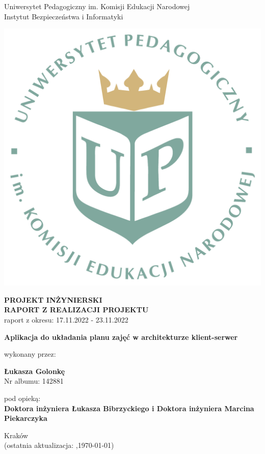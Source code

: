 \documentclass[12pt,a4paper,oneside]{article}
\theoremstyle{definition}
\numberwithin{equation}{section}
\begin{document}

\thispagestyle{empty}
\begin{titlepage}
\begin{center}\Large
Uniwersytet Pedagogiczny im. Komisji Edukacji Narodowej \\
\large
Instytut Bezpieczeństwa i Informatyki\\
\vskip 10pt
\end{center}
\begin{center}
\centering \includegraphics[width=0.4\columnwidth]{../resources/images/logoUP_pl.pdf}
\end{center}

\begin{center}
 {\bf \fontsize{14pt}{14pt}\selectfont PROJEKT INŻYNIERSKI \\ RAPORT Z REALIZACJI PROJEKTU\\
 }
 {\fontsize{12pt}{12pt} raport z okresu: 17.11.2022 - 23.11.2022}
\end{center}
\vskip 5pt
\begin{center}
 {\bf \fontsize{22pt}{22pt}\selectfont Aplikacja do układania planu zajęć w architekturze klient-serwer}
\end{center}

\begin{center}
 {\fontsize{12pt}{12pt}\selectfont wykonany przez: }
\end{center}
\begin{center}
 {\bf\fontsize{16pt}{16pt}\selectfont Łukasza Golonkę}\\
 {\fontsize{12pt}{12pt}\selectfont Nr albumu: 142881 \\}
\end{center}
\begin{center}
 {\fontsize{12pt}{12pt}\selectfont pod opieką:}\\
 {\bf\fontsize{12pt}{12pt}\selectfont Doktora inżyniera Łukasza Bibrzyckiego i Doktora inżyniera Marcina Piekarczyka}
\end{center}

\vspace*{\fill}
\begin{center}
\large
Kraków \the\year\\
(ostatnia aktualizacja: \DTMcurrenttime,\;\today)
\end{center}
\end{titlepage}
\setcounter{page}{0} 
\newpage\null\thispagestyle{empty}
\end{document}
